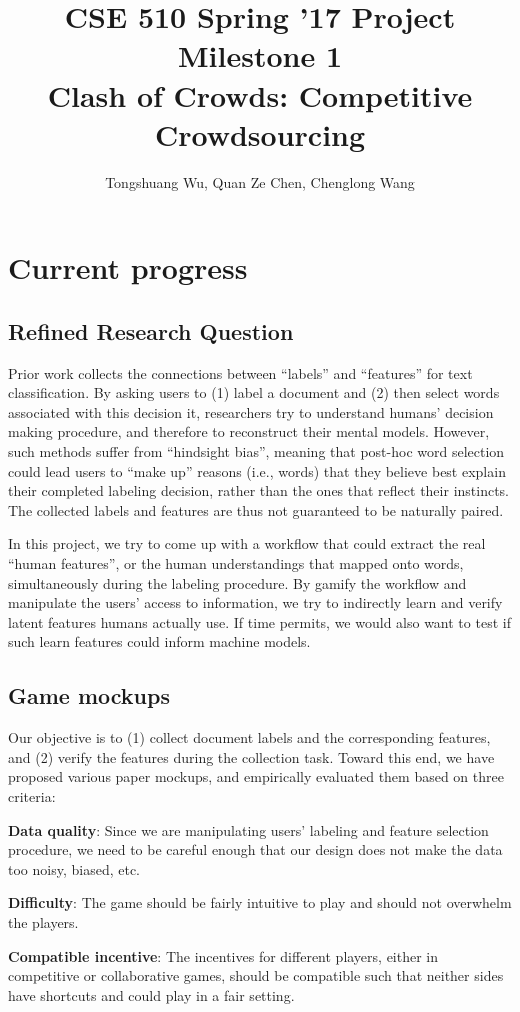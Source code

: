 \documentclass{article}
\title{{\large{CSE 510 Spring '17 Project Milestone 1}}
\\ \textbf{Clash of Crowds: Competitive Crowdsourcing}}
\author{Tongshuang Wu, Quan Ze Chen, Chenglong Wang}
\date{}
\begin{document}
\maketitle


\section{Current progress}

\subsection{Refined Research Question}

Prior work collects the connections between  ``labels'' and ``features'' for text classification. 
By asking users to (1) label a document and (2) then select words associated with this decision it, researchers try to understand humans' decision making procedure, and therefore to reconstruct their mental models.
However, such methods suffer from ``hindsight bias'', meaning that post-hoc word selection could lead users to ``make up'' reasons (i.e., words) that they believe best explain their completed labeling decision, rather than the ones that reflect their instincts.
The collected labels and features are thus not guaranteed to be naturally paired.

In this project, we try to come up with a workflow that could extract the real ``human features'', or the human understandings that mapped onto words, simultaneously during the labeling procedure.
By gamify the workflow and manipulate the users' access to information, we try to indirectly learn and verify latent features humans actually use.
If time permits, we would also want to test if such learn features could inform machine models.

\subsection{Game mockups}
\label{sec:mockup}
Our objective is to (1) collect document labels and the corresponding features, and (2) verify the features during the collection task.
Toward this end, we have proposed various paper mockups, and empirically evaluated them based on three criteria:
\begin{compactitem}
	\item \textbf{Data quality}: Since we are manipulating users' labeling and feature selection procedure, we need to be careful enough that our design does not make the data too noisy, biased, etc.
	\item \textbf{Difficulty}: The game should be fairly intuitive to play and should not overwhelm the players. 
	\item \textbf{Compatible incentive}: The incentives for different players, either in competitive or collaborative games, should be compatible such that neither sides have shortcuts and could play in a fair setting.
\end{compactitem}
 
\end{document}
